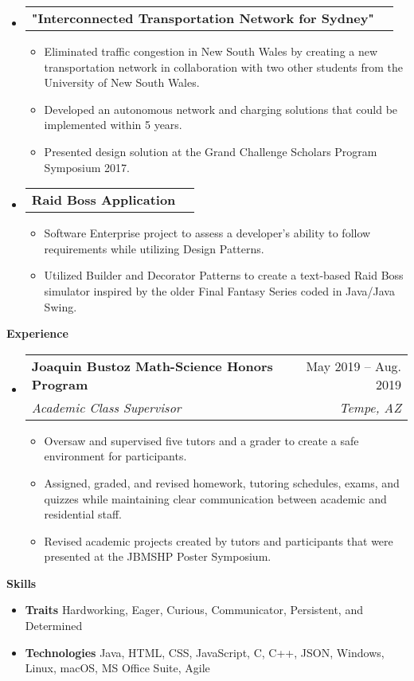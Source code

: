 \documentclass[letterpaper,12pt]{article}[leftmargin=*]
\makeatletter
\def \entryspacing {-0pt}
\renewcommand{\section}[2]{\vspace{5pt}
  \colorbox{secondary}{\color{white}\raggedbottom\normalsize\textbf{{#1}{\hspace{7pt}#2}}}
}
\newcommand{\resumeEntryStart}{\begin{itemize}[leftmargin=2.5mm]}
\newcommand{\resumeEntryEnd}{\end{itemize}\vspace{\entryspacing}}
\newcommand{\resumeItemListStart}{\begin{itemize}[leftmargin=4.5mm]}
\newcommand{\resumeItemListEnd}{\end{itemize}}
\newcommand{\resumeItem}[1]{
  \item\small{
    {#1 \vspace{-2pt}}
  }
}
\newcommand{\resumeEntryTSDL}[4]{
  \vspace{-1pt}\item[]
    \begin{tabularx}{0.97\textwidth}{X@{\hspace{60pt}}r}
      \textbf{\color{primary}#1} & {\firabook\color{accent}\small#2} \\
      \textit{\color{accent}\small#3} & \textit{\color{accent}\small#4} \\
    \end{tabularx}\vspace{-6pt}
}
\newcommand{\resumeEntryTD}[2]{
  \vspace{-1pt}\item[]
    \begin{tabularx}{0.97\textwidth}{X@{\hspace{60pt}}r}
      \textbf{\color{primary}#1} & {\firabook\color{accent}\small#2} \\
    \end{tabularx}\vspace{-6pt}
}
\newcommand{\resumeEntryS}[2]{
  \item[]\small{
    \textbf{\color{primary}#1 }{ #2 \vspace{-6pt}}
  }
}
\makeatother
\begin{document}
  \resumeEntryStart
    \resumeEntryTD
      {"Interconnected Transportation Network for Sydney"}{}
    \resumeItemListStart
      \resumeItem {Eliminated traffic congestion in New South Wales by creating a new transportation network in collaboration with two other students from the University of New South Wales.}
            \resumeItem {Developed an autonomous network and charging solutions that could be implemented within 5 years.}
                  \resumeItem {Presented design solution at the Grand Challenge Scholars Program Symposium 2017.}
    \resumeItemListEnd
  \resumeEntryEnd
  
      \resumeEntryStart
    \resumeEntryTD
      {Raid Boss Application}{}
    \resumeItemListStart
      \resumeItem {Software Enterprise project to assess a developer's ability to follow requirements while utilizing Design Patterns.}
      \resumeItem {Utilized Builder and Decorator Patterns to create a text-based Raid Boss simulator inspired by the older Final Fantasy Series coded in Java/Java Swing. }
    \resumeItemListEnd
  \resumeEntryEnd

\section{\faPieChart}{Experience}

  \resumeEntryStart
    \resumeEntryTSDL
      {Joaquin Bustoz Math-Science Honors Program}{May 2019 -- Aug. 2019}
      {Academic Class Supervisor}{Tempe, AZ}
    \resumeItemListStart
      \resumeItem {Oversaw and supervised five tutors and a grader to create a safe environment for participants.}
      \resumeItem {Assigned, graded, and revised homework, tutoring schedules, exams, and quizzes while maintaining clear communication between academic and residential staff.}
      \resumeItem {Revised academic projects created by tutors and participants that were presented at the JBMSHP Poster Symposium.}
    \resumeItemListEnd
  \resumeEntryEnd
  
\section{\faGears}{Skills}
 \resumeEntryStart
  \resumeEntryS{Traits } {Hardworking, Eager, Curious, Communicator, Persistent,  and Determined }
  \resumeEntryS{Technologies } {Java, HTML, CSS, JavaScript, C, C++, JSON,  Windows, Linux, macOS, MS Office Suite, Agile}
 \resumeEntryEnd
\end{document}
